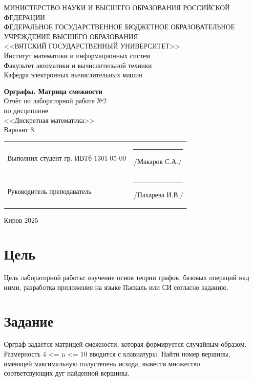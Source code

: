 \documentclass[a4paper,14pt]{extarticle}
\begin{document}
  \newpage\thispagestyle{empty}
  \begin{center}
    \MakeUppercase{
      Министерство науки и высшего образования Российской Федерации\\
      Федеральное государственное бюджетное образовательное учреждение высшего образования\\
      <<Вятский Государственный Университет>>\\
    }
    Институт математики и информационных систем\\
    Факультет автоматики и вычислительной техники\\
    Кафедра электронных вычислительных машин
  \end{center}
  \vfill

  \begin{center}
    \textbf{Орграфы. Матрица смежности}\\
    Отчёт по лабораторной работе №2\\
    по дисциплине\\
    <<Дискретная математика>>\\
    Вариант 8
  \end{center}
  \vfill

  \noindent
  \begin{tabular}{ll}
    Выполнил студент гр. ИВТб-1301-05-00 \hspace{5mm} &
    \rule[-1mm]{25mm}{0.10mm}\,/Макаров С.А./\\
    
    Руководитель преподаватель & \rule[-1mm]{25mm}{0.10mm}\,/Пахарева И.В./\\
  \end{tabular}

  \vfill
  \begin{center}
    Киров 2025
  \end{center}

  \newpage
  \section*{\hspace{12.5mm}Цель}
  Цель лабораторной работы: изучение основ теории графов, базовых операций над ними, разработка приложения на языке Паскаль или СИ согласно заданию.

  \section*{\hspace{12.5mm}Задание}
  Орграф задается матрицей смежности, которая формируется случайным образом. Размерность 4 <= n <= 10 вводится с клавиатуры. Найти номер вершины, имеющей максимальную полустепень исхода, вывести множество соответсвующих дуг найденной вершины.
\end{document}
